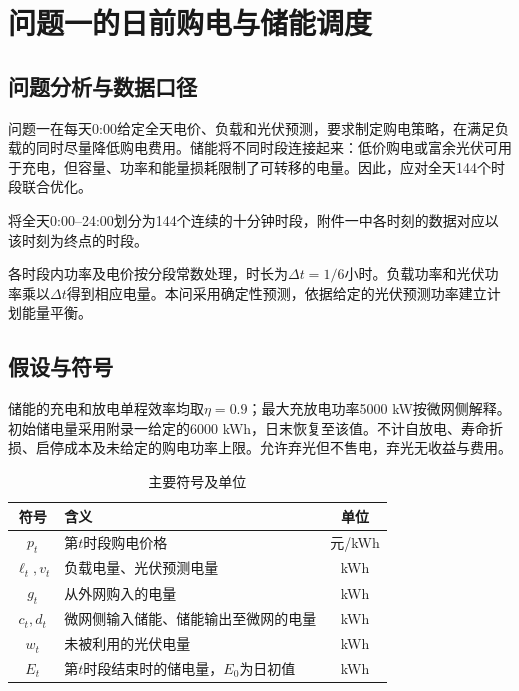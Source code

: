 \section{问题一的日前购电与储能调度}
\subsection{问题分析与数据口径}
问题一在每天0:00给定全天电价、负载和光伏预测，要求制定购电策略，在满足负载的同时尽量降低购电费用。储能将不同时段连接起来：低价购电或富余光伏可用于充电，但容量、功率和能量损耗限制了可转移的电量。因此，应对全天144个时段联合优化。

将全天0:00--24:00划分为144个连续的十分钟时段，附件一中各时刻的数据对应以该时刻为终点的时段。

各时段内功率及电价按分段常数处理，时长为$\Delta t=1/6$小时。负载功率和光伏功率乘以$\Delta t$得到相应电量。本问采用确定性预测，依据给定的光伏预测功率建立计划能量平衡。

\subsection{假设与符号}
储能的充电和放电单程效率均取$\eta=0.9$；最大充放电功率5000 kW按微网侧解释。初始储电量采用附录一给定的6000 kWh，日末恢复至该值。不计自放电、寿命折损、启停成本及未给定的购电功率上限。允许弃光但不售电，弃光无收益与费用。

\begin{table}[htbp]\centering
\caption{主要符号及单位}
\begin{tabular}{clc}\toprule
符号 & 含义 & 单位 \\\midrule
$p_t$ & 第$t$时段购电价格 & 元/kWh \\
$\ell_t,v_t$ & 负载电量、光伏预测电量 & kWh \\
$g_t$ & 从外网购入的电量 & kWh \\
$c_t,d_t$ & 微网侧输入储能、储能输出至微网的电量 & kWh \\
$w_t$ & 未被利用的光伏电量 & kWh \\
$E_t$ & 第$t$时段结束时的储电量，$E_0$为日初值 & kWh \\
\bottomrule\end{tabular}\end{table}

